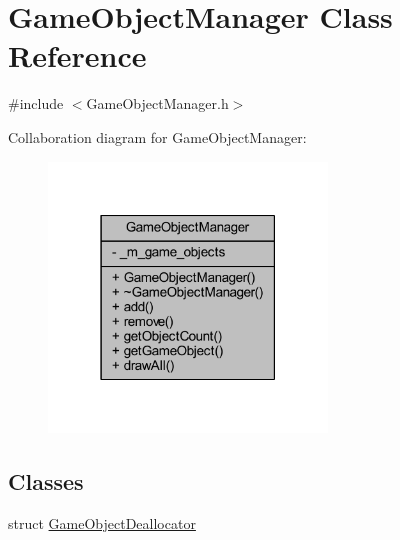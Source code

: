 \hypertarget{class_game_object_manager}{\section{Game\+Object\+Manager Class Reference}
\label{class_game_object_manager}
}


{\ttfamily \#include $<$Game\+Object\+Manager.\+h$>$}



Collaboration diagram for Game\+Object\+Manager\+:
\nopagebreak
\begin{figure}[H]
\begin{center}
\leavevmode
\includegraphics[width=210pt]{class_game_object_manager__coll__graph}
\end{center}
\end{figure}
\subsection*{Classes}
\begin{DoxyCompactItemize}
\item 
struct \hyperlink{struct_game_object_manager_1_1_game_object_deallocator}{Game\+Object\+Deallocator}
\end{DoxyCompactItemize}
